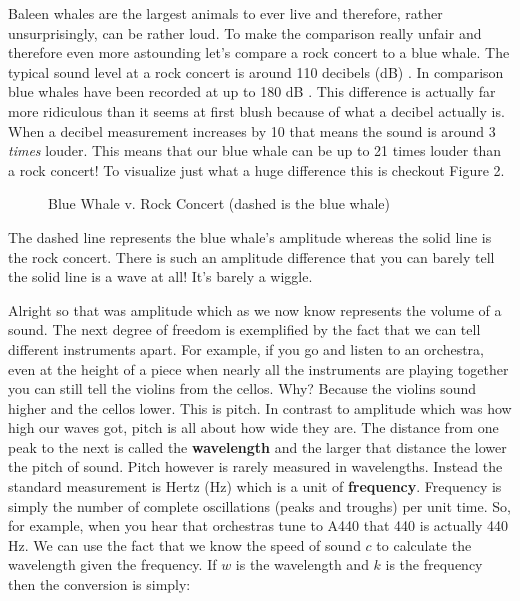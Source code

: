\documentclass[10pt,a4paper]{article}
\begin{document}
Baleen whales are the largest animals to ever live and therefore, rather unsurprisingly, can be rather loud. To make the comparison really unfair and therefore even more astounding let's compare a rock concert to a blue whale. The typical sound level at a rock concert is around 110 decibels (dB) \cite{chris}. In comparison blue whales have been recorded at up to 180 dB \cite{zcormier}. This difference is actually far more ridiculous than it seems at first blush because of what a decibel actually is. When a decibel measurement increases by 10 that means the sound is around 3 \textit{times} louder. This means that our blue whale can be up to 21 times louder than a rock concert! To visualize just what a huge difference this is checkout Figure 2.

\begin{figure}[!htb]
\caption{\label{fig:my-label} Blue Whale v. Rock Concert (dashed is the blue whale)}
\end{figure}

The dashed line represents the blue whale's amplitude whereas the solid line is the rock concert. There is such an amplitude difference that you can barely tell the solid line is a wave at all! It's barely a wiggle. 

Alright so that was amplitude which as we now know represents the volume of a sound. The next degree of freedom is exemplified by the fact that we can tell different instruments apart. For example, if you go and listen to an orchestra, even at the height of a piece when nearly all the instruments are playing together you can still tell the violins from the cellos. Why? Because the violins sound higher and the cellos lower. This is pitch. In contrast to amplitude which was how high our waves got, pitch is all about how wide they are. The distance from one peak to the next is called the \textbf{wavelength} and the larger that distance the lower the pitch of sound. Pitch however is rarely measured in wavelengths. Instead the standard measurement is Hertz (Hz) which is a unit of \textbf{frequency}. Frequency is simply the number of complete oscillations (peaks and troughs) per unit time. So, for example, when you hear that orchestras tune to A440 that 440 is actually 440 Hz. We can use the fact that we know the speed of sound $c$ to calculate the wavelength given the frequency. If $w$ is the wavelength and $k$ is the frequency then the conversion is simply:
\end{document}
